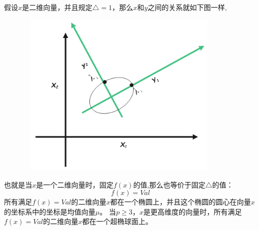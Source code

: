 \documentclass[withoutpreface,bwprint]{cumcmthesis} %
\begin{document}
	假设$x$是二维向量，并且规定$\bigtriangleup=1$，那么$x$和$y$之间的关系就如下图一样,
	\begin{figure}[h]
		\centering
		\includegraphics[width=10.0cm,height=8.0cm]{figures/x_y.png}
	\end{figure}
	也就是当$x$是一个二维向量时，固定$f(x)$的值,那么也等价于固定$\bigtriangleup$的值：
	\begin{equation}
		f(x)=Val
	\end{equation}
	所有满足$f(x)=Val$的二维向量$x$都在一个椭圆上，并且这个椭圆的圆心在向量$x$的坐标系中的坐标是均值向量$\mu$。
	当$p\geq3$，$x$是更高维度的向量时，所有满足$f(x)=Val$的二维向量$x$都在一个超椭球面上。
\end{document}

